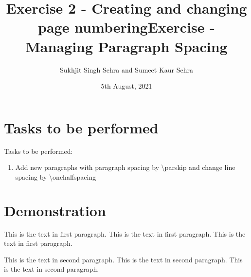 \documentclass{article}
\title{Exercise 2 - Creating and changing page numbering}
\title{Exercise - Managing Paragraph Spacing}
\author{Sukhjit Singh Sehra and Sumeet Kaur Sehra}
\date{5th August, 2021}
\begin{document}
	\maketitle
	\doublespacing
	
	\section*{Tasks to be performed}
	Tasks to be performed:
	\begin{enumerate}
		\item Add new paragraphs with paragraph spacing by \textbackslash parskip and change line spacing by \textbackslash onehalfspacing
	\end{enumerate}
	\section*{Demonstration}

	This is the text in first paragraph. This is the text in first 
	paragraph. This is the text in first paragraph. \par
	This is the text in second paragraph. This is the text in second 
	paragraph. This is the text in second paragraph.
\end{document}
